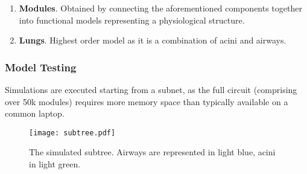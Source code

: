 \begin{enumerate}
\item \textbf{Modules}.  Obtained by connecting the aforementioned
  components together into functional models representing a
  physiological structure.
\item \textbf{Lungs}.  Highest order model as it is a combination of
  acini and airways.
\end{enumerate}





\subsubsection{Model Testing}
\label{subsubsec:model_testing}

Simulations are executed starting from a subnet, as the full circuit
(comprising over 50k modules) requires more memory space than
typically available on a common laptop.

\begin{figure}[H]
  \centering
  \texttt{[image: subtree.pdf]}
  \caption{The simulated subtree.  Airways are represented in light blue, acini in light green.}
  \label{fig:subtree_development}
\end{figure}



